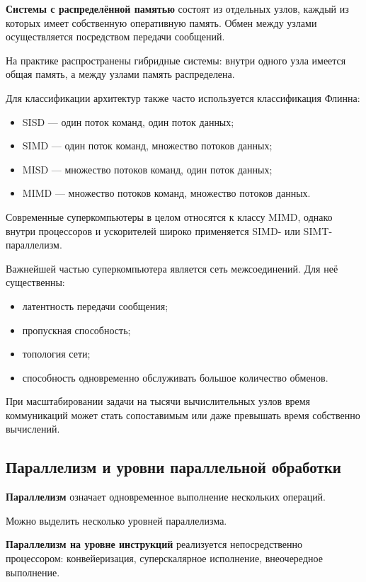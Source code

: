 \textbf{Системы с распределённой памятью} состоят из отдельных узлов,
каждый из которых имеет собственную оперативную память. Обмен между узлами
осуществляется посредством передачи сообщений.

На практике распространены гибридные системы:
внутри одного узла имеется общая память, а между узлами память распределена.

Для классификации архитектур также часто используется классификация Флинна:
\begin{itemize}
	\item SISD --- один поток команд, один поток данных;
	\item SIMD --- один поток команд, множество потоков данных;
	\item MISD --- множество потоков команд, один поток данных;
	\item MIMD --- множество потоков команд, множество потоков данных.
\end{itemize}

Современные суперкомпьютеры в целом относятся к классу MIMD, однако внутри
процессоров и ускорителей широко применяется SIMD- или SIMT-параллелизм.

Важнейшей частью суперкомпьютера является сеть межсоединений.
Для неё существенны:
\begin{itemize}
	\item латентность передачи сообщения;
	\item пропускная способность;
	\item топология сети;
	\item способность одновременно обслуживать большое количество обменов.
\end{itemize}

При масштабировании задачи на тысячи вычислительных узлов время коммуникаций
может стать сопоставимым или даже превышать время собственно вычислений.

\subsection{Параллелизм и уровни параллельной обработки}

\textbf{Параллелизм} означает одновременное выполнение нескольких операций.

Можно выделить несколько уровней параллелизма.

\textbf{Параллелизм на уровне инструкций} реализуется непосредственно
процессором: конвейеризация, суперскалярное исполнение, внеочередное выполнение.


